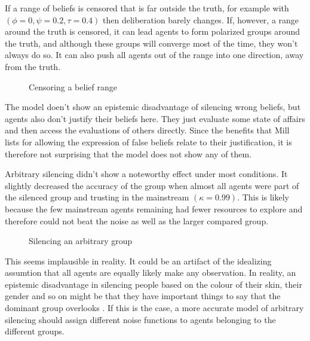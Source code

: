 \documentclass{essay-formal}
\begin{document}
If a range of beliefs is censored that is far outside the truth, for example with $(\phi = 0, \psi = 0.2, \tau = 0.4)$ then deliberation barely changes.  If, however, a range around the truth is censored, it can lead agents to form polarized groups around the truth, and although these groups will converge most of the time, they won't always do so. It can also push all agents out of the range into one direction, away from the truth.



\begin{figure}
    \centering
    \caption{Censoring a belief range}
    
\end{figure}

The model doen't show an epistemic disadvantage of silencing wrong beliefs, but agents also don't justify their beliefs here. They just evaluate some state of affairs and then access the evaluations of others directly. Since the benefits that Mill lists for allowing the expression of false beliefs relate to their justification, it is therefore not surprising that the model does not show any of them.

Arbitrary silencing didn't show a noteworthy effect under most conditions. It slightly decreased the accuracy of the group when almost all agents were part of the silenced group and trusting in the mainstream $(\kappa=0.99)$. This is likely because the few mainstream agents remaining had fewer resources to explore and therefore could not beat the noise as well as the larger compared group.

\begin{figure}
    \centering
    \caption{Silencing an arbitrary group}
    
\end{figure}

This seems implausible in reality. It could be an artifact of the idealizing assumtion that all agents are equally likely make any observation. In reality, an epistemic disadvantage in silencing people based on the colour of their skin, their gender and so on might be that they have important things to say that the dominant group overlooks \parencite[This idea is developed in the literature on standpoint epistemology. See for example][]{harding2015}. If this is the case, a more accurate model of arbitrary silencing should assign different noise functions to agents belonging to the different groups.
\end{document}
